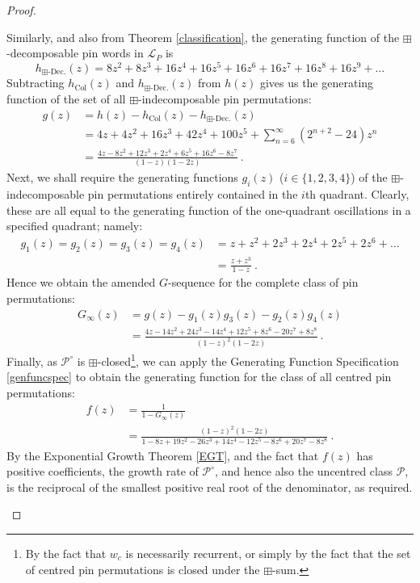 \documentclass[11pt,a4paper]{article}
\theoremstyle{definition}
\begin{document}
\begin{proof}
\begin{enumerate}
Similarly, and also from Theorem \ref{classification}, the generating function of the $\boxplus$-decomposable pin words in $\mathcal{L}_{P}$ is
\[
h_{\boxplus\text{-Dec.}}(z) = 8z^2 + 8z^3 + 16z^4 + 16z^5 + 16z^6 + 16z^7 + 16z^8 + 16z^9 + \dots
\]
Subtracting $h_{\text{Col}}(z)$ and $h_{\boxplus\text{-Dec.}}(z)$ from $h(z)$ gives us the generating function of the set of all $\boxplus$-indecomposable pin permutations:
\[
\begin{split}
g(z) & = h(z) - h_{\text{Col}}(z) - h_{\boxplus\text{-Dec.}}(z) \\
 & = 4z + 4z^2 + 16z^3 + 42z^4 + 100z^5 + \sum_{n=6}^{\infty}(2^{n + 2} - 24)z^n \\
 & = \frac{4z - 8z^2 + 12z^3 + 2z^4 + 6z^5 + 16z^6 - 8z^7}{(1-z)(1-2z)} \ .
\end{split}
\]
Next, we shall require the generating functions $g_{i}(z)$ ($i \in \{1,2,3,4\}$) of the $\boxplus$-indecomposable pin permutations entirely contained in the $i$th quadrant. Clearly, these are all equal to the generating function of the one-quadrant oscillations in a specified quadrant; namely:
\[
\begin{split}
g_{1}(z) = g_{2}(z) = g_{3}(z) = g_{4}(z) & = z + z^2 + 2z^3 + 2z^4 + 2z^5 + 2z^6 + \dots \\
 & = \frac{z + z^3}{1-z} \ .
\end{split}
\]
Hence we obtain the amended $G$-sequence for the complete class of pin permutations:
\[
\begin{split}
G_{\infty}(z) & = g(z) - g_{1}(z)g_{3}(z) - g_{2}(z)g_{4}(z) \\
 & = \frac{4z - 14z^2 + 24z^3 - 14z^4 + 12z^5 + 8z^6 - 20z^7 + 8z^8}{(1-z)^{2}(1-2z)} \ .
\end{split}
\]
Finally, as $\mathcal{P}^{\circ}$ is $\boxplus$-closed\footnote{By the fact that $w_{c}$ is necessarily recurrent, or simply by the fact that the set of centred pin permutations is closed under the $\boxplus$-sum.}, we can apply the Generating Function Specification \ref{genfuncspec} to obtain the generating function for the class of all centred pin permutations:
\[
\begin{split}
f(z) & = \frac{1}{1 - G_{\infty}(z)} \\
 & = \frac{(1-z)^{2}(1-2z)}{1 - 8z + 19z^2 - 26z^3 + 14z^4 - 12z^5 - 8z^6 + 20z^7 - 8z^8} \ .
\end{split}
\]
By the Exponential Growth Theorem \ref{EGT}, and the fact that $f(z)$ has positive coefficients, the growth rate of $\mathcal{P}^{\circ}$, and hence also the uncentred class $\mathcal{P}$, is the reciprocal of the smallest positive real root of the denominator, as required.\qedhere
\end{enumerate}
\end{proof}
\end{document}
